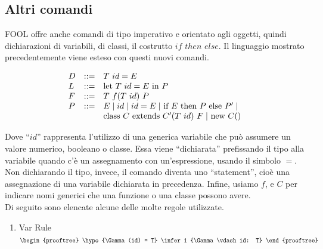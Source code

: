 \subsection{Altri comandi}

FOOL offre anche comandi di tipo imperativo e orientato agli oggetti, quindi dichiarazioni di variabili, di classi, il costrutto $if$ $then$ $else$.
Il linguaggio mostrato precedentemente viene esteso con questi nuovi comandi.

\[
\begin{array}{lcl}
    D &::=& T$ $id = E\\
    L &::= & $let $T$ $id = E$ in $P \\
    F & ::= & T$ $f(T$ $id)$ $ P\\
    P & ::= & E \mid id \mid id = E \mid $ if $ E $ then $ P $ else $ P' \mid\\
& & $class $C$ extends $C'(T$ $id)$ $F \mid $ new $ C()\\ 
\end{array}
\]

Dove ``$id$'' rappresenta l'utilizzo di una generica variabile che può assumere un valore numerico, booleano o classe.
Essa viene ``dichiarata'' prefissando il tipo alla variabile quando c'è un assegnamento con un'espressione, usando il simbolo $=$. Non dichiarando 
il tipo, invece, il comando diventa uno ``statement'', cioè una assegnazione di una variabile dichiarata in precedenza.
Infine, usiamo $f$, e $C$ per indicare nomi generici che una funzione o una classe possono avere.\\

Di seguito sono elencate alcune delle molte regole utilizzate.

\begin{multicols}{2}
    \begin{enumerate}
        \item Var Rule
    \[
        \begin{prooftree}
            \hypo {\Gamma(id) = T}
            \infer 1 {\Gamma \vdash id: T}
        \end{prooftree}\\
    \]
    \end{enumerate}
\end{multicols}
